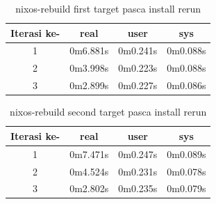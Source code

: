 \documentclass[10pt,twoside]{report}
\begin{document}
\begin{adjustwidth}{20pt}{}
\begin{adjustwidth}{20pt}{}
	\end{adjustwidth}
	\begin{table}[H]
		\caption{nixos-rebuild first target pasca install rerun}
		\begin{center}
			\begin{tabular}[c]{|c|c|c|c|}
				\hline
				\multicolumn{1}{|c|}{\textbf{Iterasi ke-}} &
				\multicolumn{1}{c|}{\textbf{real}}         &
				\multicolumn{1}{c|}{\textbf{user}}         &
				\multicolumn{1}{c|}{\textbf{sys}}                                           \\
				\hline
				1                                          & 0m6.881s & 0m0.241s & 0m0.088s \\
				\hline
				2                                          & 0m3.998s & 0m0.223s & 0m0.088s \\
				\hline
				3                                          & 0m2.899s & 0m0.227s & 0m0.086s \\
				\hline
			\end{tabular}
		\end{center}
	\end{table}
	\vspace{-5mm}
	\begin{table}[H]
		\caption{nixos-rebuild second target pasca install rerun}
		\begin{center}
			\begin{tabular}[c]{|c|c|c|c|}
				\hline
				\multicolumn{1}{|c|}{\textbf{Iterasi ke-}} &
				\multicolumn{1}{c|}{\textbf{real}}         &
				\multicolumn{1}{c|}{\textbf{user}}         &
				\multicolumn{1}{c|}{\textbf{sys}}                                           \\
				\hline
				1                                          & 0m7.471s & 0m0.247s & 0m0.089s \\
				\hline
				2                                          & 0m4.524s & 0m0.231s & 0m0.078s \\
				\hline
				3                                          & 0m2.802s & 0m0.235s & 0m0.079s \\
				\hline
			\end{tabular}
		\end{center}
	\end{table}

\end{adjustwidth}
\end{document}
